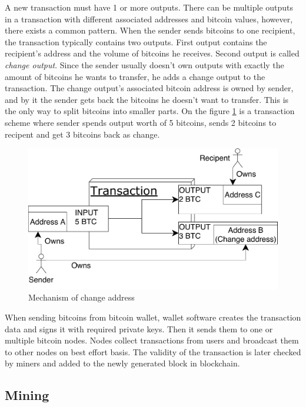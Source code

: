 \documentclass[
  digital, %
  table,   %
  lof,     %
  lot,     %
  oneside
]{fithesis3}
\begin{document}
A new transaction must have 1 or more outputs.
There can be multiple outputs in a transaction with different associated addresses and bitcoin values,
however, there exists a common pattern. When the sender sends bitcoins to one recipient,
the transaction typically contains two outputs.
First output contains the recipient's address and the volume of bitcoins he receives.
Second output is called \emph{change output}.
Since the sender usually doesn't own outputs with exactly the amount of bitcoins
he wants to transfer, he adds a change output to the transaction.
The change output's associated bitcoin address is owned by sender,
and by it the sender gets back the bitcoins he doesn't want to transfer.
This is the only way to split bitcoins into smaller parts. 
On the figure \ref{change} is a transaction scheme where sender spends output worth of 5 bitcoins,
sends 2 bitcoins to recipent and get 3 bitcoins back as change. 
 
\begin{figure}[!htb]
    \centering
    \includegraphics[width=1\textwidth]{change}
    \caption{Mechanism of change address}
    \label{change}
\end{figure}
 
When sending bitcoins from bitcoin wallet,
 wallet software creates the transaction data and signs it with required private keys.
 Then it sends them to one or multiple bitcoin nodes.
Nodes collect transactions from users and broadcast them to other nodes on best effort basis.
The validity of the transaction is later checked by miners and added to the newly generated block
in blockchain.

\subsection{Mining}
\end{document}
